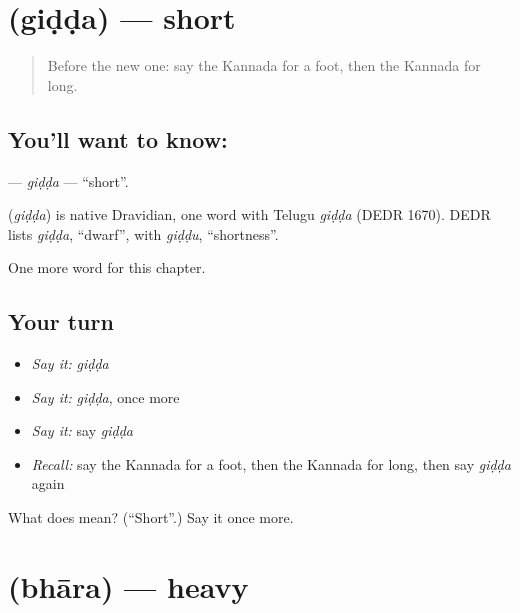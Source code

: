\section[\texorpdfstring{\kn{ಗಿಡ್ಡ} (giḍḍa)}{ಗಿಡ್ಡ (giḍḍa)}]{ (giḍḍa) — short}

\label{lesson:KA-C140-gidda}



\begin{quote}
Before the new one: say the Kannada for a foot, then the Kannada for long.
\end{quote}

\subsection*{You'll want to know: }
\textbf{} — \emph{giḍḍa} — \textquotedblleft{}short\textquotedblright{}.

\begin{cousinweb}
\textbf{} (\emph{giḍḍa}) is native Dravidian, one word with Telugu \emph{giḍḍa} (DEDR 1670). DEDR lists \emph{giḍḍa}, \textquotedblleft{}dwarf\textquotedblright{}, with \emph{giḍḍu}, \textquotedblleft{}shortness\textquotedblright{}.
\end{cousinweb}

\begin{grammarlens}[title={What you've built}]
One more word for this chapter.
\end{grammarlens}

\subsection*{Your turn}
\begin{itemize}
\raggedright
  \item \emph{Say it:} \emph{giḍḍa}
  \item \emph{Say it:} \emph{giḍḍa}, once more
  \item \emph{Say it:} say \emph{giḍḍa}
  \item \emph{Recall:} say the Kannada for a foot, then the Kannada for long, then say \emph{giḍḍa} again
\end{itemize}

\begin{tcolorbox}[breakable,colback=teal!4,colframe=teal!35!black,title={Before you move on}]
What does  mean? (\textquotedblleft{}Short\textquotedblright{}.) Say it once more.
\end{tcolorbox}
\section[\texorpdfstring{\kn{ಭಾರ} (bhāra)}{ಭಾರ (bhāra)}]{ (bhāra) — heavy}

